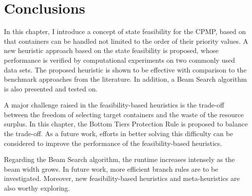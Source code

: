 \documentclass{article}
\begin{document}
\section{Conclusions}
\label{cpmp:sec:conclusion}

In this chapter, I introduce a concept of state feasibility for the CPMP, based on that containers can be handled not limited to the order of their priority values. A new heuristic approach based on the state feasibility is proposed, whose performance is verified by computational experiments on two commonly used data sets. The proposed heuristic is shown to be effective with comparison to the benchmark approaches from the literature. In addition, a Beam Search algorithm is also presented and tested on.

A major challenge raised in the feasibility-based heuristics is the trade-off between the freedom of selecting target containers and the waste of the resource surplus. In this chapter, the Bottom Tiers Protection Rule is proposed to balance the trade-off. As a future work, efforts in better solving this difficulty can be considered to improve the performance of the feasibility-based heuristics.
 
Regarding the Beam Search algorithm, the runtime increases intensely as the beam width grows. In future work, more efficient branch rules are to be investigated.
Moreover, new feasibility-based heuristics and meta-heuristics are also worthy exploring. 



\end{document}
